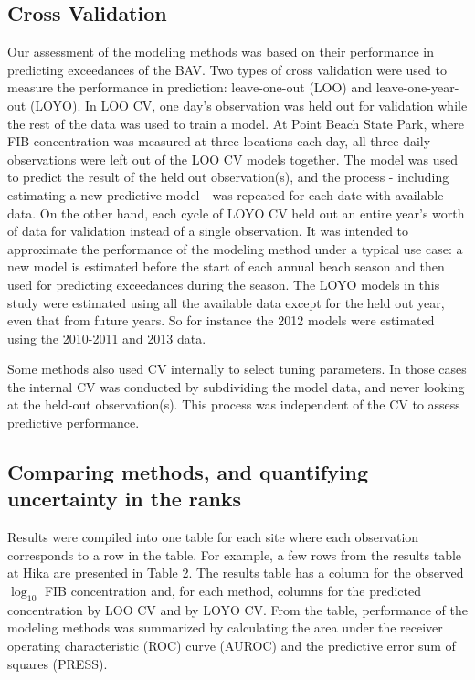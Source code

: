 \documentclass[authoryear,review, 12pt]{elsarticle}
\begin{document}
\subsection{Cross Validation}\label{cross-validation}

Our assessment of the modeling methods was based on their performance
in predicting exceedances of the BAV. Two types of cross validation were
used to measure the performance in prediction: leave-one-out (LOO) and
leave-one-year-out (LOYO). In LOO CV, one day's observation was held out
for validation while the rest of the data was used to train a model. At
Point Beach State Park, where FIB concentration was measured at three
locations each day, all three daily observations were left out of the
LOO CV models together. The model was used to predict the result of the
held out observation(s), and the process - including estimating a new
predictive model - was repeated for each date with available data. On
the other hand, each cycle of LOYO CV held out an entire year's worth of
data for validation instead of a single observation. It was intended to
approximate the performance of the modeling method under a typical
use case: a new model is estimated before the start of each annual beach
season and then used for predicting exceedances during the season. The
LOYO models in this study were estimated using all the available data
except for the held out year, even that from future years. So for
instance the 2012 models were estimated using the 2010-2011 and 2013
data.

Some methods also used CV internally to select tuning parameters. In
those cases the internal CV was conducted by subdividing the model data,
and never looking at the held-out observation(s). This process was
independent of the CV to assess predictive performance.

\subsection{Comparing methods, and quantifying uncertainty in the
ranks}\label{comparing-methods-and-quantifying-uncertainty-in-the-ranks}

Results were compiled into one table for each site where each
observation corresponds to a row in the table. For example, a few rows
from the results table at Hika are presented in Table 2. The results
table has a column for the observed \(\log_{10}\) FIB concentration and,
for each method, columns for the predicted concentration by LOO CV and
by LOYO CV. From the table, performance of the modeling methods was
summarized by calculating the area under the receiver operating
characteristic (ROC) curve (AUROC) and the predictive error sum of
squares (PRESS).
\end{document}
